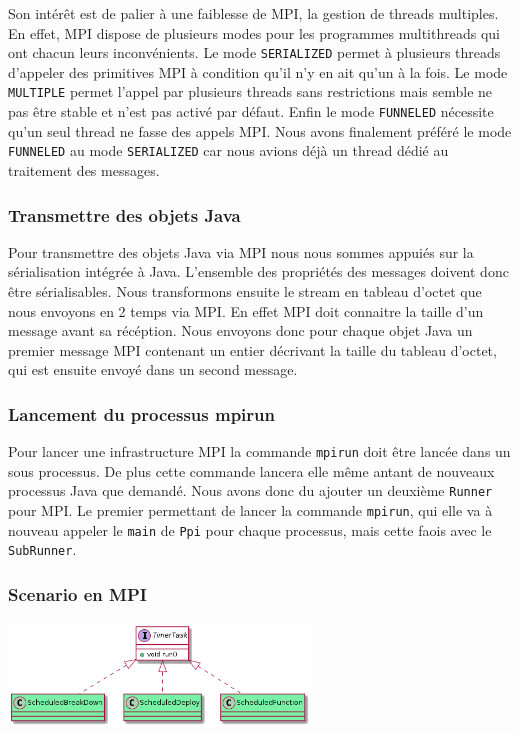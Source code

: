 \documentclass{article}
\begin{document}
				Son intérêt est de palier à une faiblesse de MPI, la gestion de threads
				multiples. En effet, MPI dispose de plusieurs modes pour les programmes
				multithreads qui ont chacun leurs inconvénients. Le mode \lstinline{SERIALIZED}
				permet à plusieurs threads d'appeler
				des primitives MPI à condition qu'il n'y en ait qu'un à la fois. Le mode
				\lstinline{MULTIPLE} permet l'appel par plusieurs threads sans restrictions mais
				semble ne pas être stable et n'est pas activé par défaut. Enfin le mode
				\lstinline{FUNNELED} nécessite qu'un seul thread ne fasse des appels MPI.
				Nous avons finalement préféré le mode \lstinline{FUNNELED} au mode
				\lstinline{SERIALIZED} car nous avions déjà un thread dédié au traitement des
				messages.

				\subsubsection{Transmettre des objets Java}
				Pour transmettre des objets Java via MPI nous nous sommes appuiés sur la sérialisation
				intégrée à Java. L'ensemble des propriétés des messages doivent donc être sérialisables.
				Nous transformons ensuite le stream en tableau d'octet que nous envoyons en 2 temps via MPI.
				En effet MPI doit connaitre la taille d'un message avant sa récéption.
				Nous envoyons donc pour chaque objet Java un premier message MPI contenant un entier
				décrivant la taille du tableau d'octet, qui est ensuite envoyé dans un second message.

				\subsubsection{Lancement du processus mpirun}
				Pour lancer une infrastructure MPI la commande \lstinline{mpirun} doit être lancée
				dans un sous processus. De plus cette commande lancera elle même antant de nouveaux
				processus Java que demandé. Nous avons donc du ajouter un deuxième \lstinline{Runner}
				pour MPI. Le premier permettant de lancer la commande \lstinline{mpirun}, qui elle
				va à nouveau appeler le \lstinline{main} de \lstinline{Ppi} pour chaque processus,
				mais cette faois avec le \lstinline{SubRunner}.

				\subsubsection{Scenario en MPI}
				\vspace{5mm}
				\hspace*{4cm} \includegraphics[width=80mm]{uml/scenMPIuml.png}
				
\end{document}
